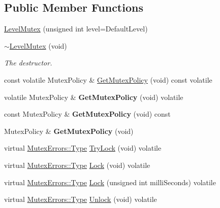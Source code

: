 \subsection*{Public Member Functions}
\begin{DoxyCompactItemize}
\item 
\hyperlink{classLoki_1_1LevelMutex_ae770e4e5ec2fa120d016eb23b56d988b}{Level\+Mutex} (unsigned int level=Default\+Level)
\item 
\hypertarget{classLoki_1_1LevelMutex_ab1670bea535a28e439a991fad4056ec2}{}\hyperlink{classLoki_1_1LevelMutex_ab1670bea535a28e439a991fad4056ec2}{$\sim$\+Level\+Mutex} (void)\label{classLoki_1_1LevelMutex_ab1670bea535a28e439a991fad4056ec2}

\begin{DoxyCompactList}\small\item\em The destructor. \end{DoxyCompactList}\item 
const volatile Mutex\+Policy \& \hyperlink{classLoki_1_1LevelMutex_a2799e7ca714a24050c71e8cc390c1633}{Get\+Mutex\+Policy} (void) const  volatile
\item 
\hypertarget{classLoki_1_1LevelMutex_adeac5d6330bf7d9e2f7c09f535d34ebc}{}volatile Mutex\+Policy \& {\bfseries Get\+Mutex\+Policy} (void) volatile\label{classLoki_1_1LevelMutex_adeac5d6330bf7d9e2f7c09f535d34ebc}

\item 
\hypertarget{classLoki_1_1LevelMutex_a7e08f814fc4b086c762c49ff728526c1}{}const Mutex\+Policy \& {\bfseries Get\+Mutex\+Policy} (void) const \label{classLoki_1_1LevelMutex_a7e08f814fc4b086c762c49ff728526c1}

\item 
\hypertarget{classLoki_1_1LevelMutex_a63e42ca5b8ff8b54265acc75701abc07}{}Mutex\+Policy \& {\bfseries Get\+Mutex\+Policy} (void)\label{classLoki_1_1LevelMutex_a63e42ca5b8ff8b54265acc75701abc07}

\item 
virtual \hyperlink{classLoki_1_1MutexErrors_acd0eb6065ca303083d2e0229d7bff590}{Mutex\+Errors\+::\+Type} \hyperlink{classLoki_1_1LevelMutex_a042a7938dafd6f149cfd7da46478c0c9}{Try\+Lock} (void) volatile
\item 
virtual \hyperlink{classLoki_1_1MutexErrors_acd0eb6065ca303083d2e0229d7bff590}{Mutex\+Errors\+::\+Type} \hyperlink{classLoki_1_1LevelMutex_a95d3742db062548201986f482a9c9b9d}{Lock} (void) volatile
\item 
virtual \hyperlink{classLoki_1_1MutexErrors_acd0eb6065ca303083d2e0229d7bff590}{Mutex\+Errors\+::\+Type} \hyperlink{classLoki_1_1LevelMutex_ad4ac0c2a33ff3d98ec0a83f70ce145da}{Lock} (unsigned int milli\+Seconds) volatile
\item 
virtual \hyperlink{classLoki_1_1MutexErrors_acd0eb6065ca303083d2e0229d7bff590}{Mutex\+Errors\+::\+Type} \hyperlink{classLoki_1_1LevelMutex_a553a379257af57ceaef9ed48b0dc8b70}{Unlock} (void) volatile
\end{DoxyCompactItemize}
